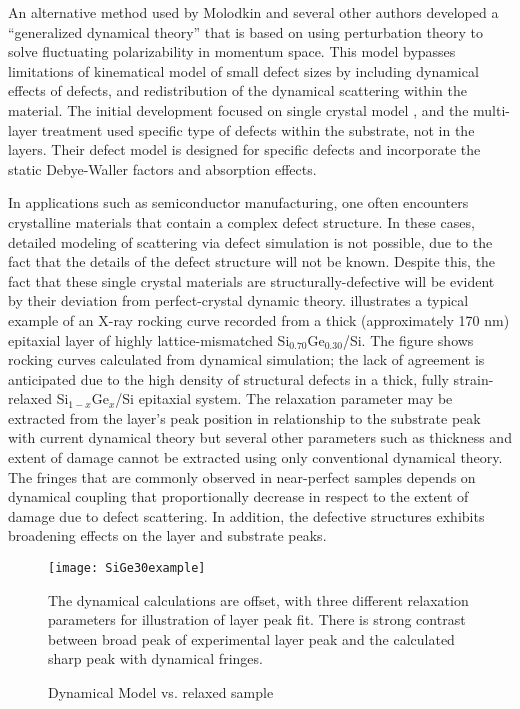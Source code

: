 An alternative method used by Molodkin and several other authors \cite{Molodkin,Molodkin1,Molodkin2,Molodkin3,Molodkin2008} developed a ``generalized dynamical theory'' that is based on using perturbation theory to solve fluctuating polarizability in momentum space.  This model bypasses limitations of kinematical model of small defect sizes by including dynamical effects of defects, and redistribution of the dynamical scattering within the material.  The initial development focused on single crystal model \cite{Molodkin,Molodkin2,Molodkin3}, and the multi-layer treatment \cite{Molodkin1} used specific type of defects within the substrate, not in the layers.  Their defect model is designed for specific defects and incorporate the static Debye-Waller factors and absorption effects.


In applications such as semiconductor manufacturing, one often encounters crystalline materials that contain a complex defect structure. In these cases, detailed modeling of scattering via defect simulation is not possible, due to the fact that the details of the defect structure will not be known. Despite this, the fact that these single crystal materials are structurally-defective will be evident by their deviation from perfect-crystal dynamic theory.   illustrates a typical example of an X-ray rocking curve recorded from a thick (approximately 170 nm) epitaxial layer of highly lattice-mismatched Si$_{0.70}$Ge$_{0.30}$/Si. The figure shows rocking curves calculated from dynamical simulation; the lack of agreement is anticipated due to the high density of structural defects in a thick, fully strain-relaxed Si$_{1-x}$Ge$_{x}$/Si epitaxial system. The relaxation parameter may be extracted from the layer's peak position in relationship to the substrate peak with current dynamical theory but several other parameters such as thickness and extent of damage cannot be extracted using only conventional dynamical theory.  The fringes that are commonly observed in near-perfect samples depends on dynamical coupling that proportionally decrease in respect to the extent of damage due to defect scattering.  In addition, the defective structures exhibits broadening effects on the layer and substrate peaks.

\begin{figure}[h]
\caption{Dynamical Model vs. relaxed sample}
\label{30example}
\begin{minipage}{\linewidth}
\texttt{[image: SiGe30example]}
\end{minipage}
The dynamical calculations are offset, with three different relaxation parameters for illustration of layer peak fit.  There is strong contrast between broad peak of experimental layer peak and the calculated sharp peak with dynamical fringes.
\end{figure}

